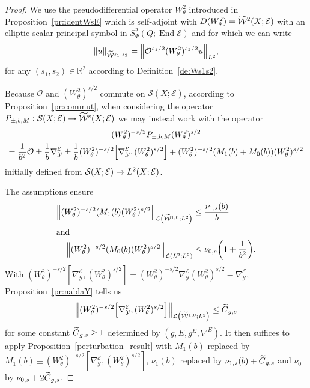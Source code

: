 \documentclass[AHL,Unicode,longabstracts]{cedram}
\newcommand{\R}{\mathbb{R}}
\newcommand{\clW}{\mathcal{W}}
\newcommand{\clY}{\mathcal{Y}}
\newcommand{\clO}{\mathcal{O}}
\newcommand{\clE}{\mathcal{E}}
\newcommand{\clS}{\mathcal{S}}
\newcommand{\clL}{\mathcal{L}}
\DeclareMathOperator{\End}{End}
\let\oldtilde\tilde
\renewcommand*{\tilde}[1]{\mathchoice{\widetilde{#1}}{\widetilde{#1}}{\oldtilde{#1}}{\oldtilde{#1}}}
\let\originalleft\left
\let\originalright\right
\renewcommand{\left}{\mathopen{}\mathclose\bgroup\originalleft}
\renewcommand{\right}{\aftergroup\egroup\originalright}
\renewcommand*{\to}{\mathchoice{\longrightarrow}{\rightarrow}{\rightarrow}{\rightarrow}}
\begin{document}
\begin{proof}
We use the pseudodifferential operator $W^{2}_{\theta}$ introduced in Proposition~\ref{pr:identWsE} which is self-adjoint with $D(W^{2}_{\theta})=\tilde{\clW}^{2}(X;\clE)$ with an elliptic scalar principal symbol in $S^{2}_{\Psi}(Q;\End\clE)$ and for which we can write
\[
\|u\|_{\widetilde{\clW}^{s_{1},s_{2}}}=\left\|\clO^{s_{1}/2}(W^{2}_{\theta})^{s_{2}/2}u\right\|_{L^{2}},
\]
for any $(s_{1},s_{2})\in \R^{2}$ according to Definition~\ref{de:Ws1s2}.

Because $\clO$ and $(W^{2}_{\theta})^{s/2}$ commute on $\clS(X;\clE)$, according to Proposition~\ref{pr:commut}, when considering the operator $P_{\pm,b,M}:\clS(X;\clE)\to \tilde{\clW}^{s}(X;\clE)$ we may instead work with the operator
\begin{multline*}
(W^2_{\theta})^{-s/2}P_{\pm,b,M}(W^2_{\theta})^{s/2}
\\
=\frac{1}{b^{2}}\clO\pm \frac{1}{b}\nabla_{\clY}^{\clE}\pm\frac{1}{b}(W^2_{\theta})^{-s/2}\left[\nabla_{\clY}^{\clE},(W^2_{\theta})^{s/2}\right]
+ (W^2_{\theta})^{-s/2}(M_{1}(b)+M_{0}(b))(W^2_{\theta})^{s/2}
\end{multline*}
initially defined from $\clS(X;\clE)\to L^{2}(X;\clE)$.

The assumptions ensure
\begin{align*}
\left\|(W^2_{\theta})^{-s/2}(M_{1}(b)(W^2_{\theta})^{s/2}\right\|_{\clL\left(\widetilde{\clW}^{1,0};L^{2}\right)}&\leq \frac{\nu_{1,s}(b)}{b}\\
\intertext{and}
\left\|(W^2_{\theta})^{-s/2}(M_{0}(b)(W^2_{\theta})^{s/2}\right\|_{\clL(L^{2};L^{2})} &\leq
\nu_{0,s}\left(1+\frac{1}{b^{2}}\right).
\end{align*}
With $(W^2_{\theta})^{-s/2}[\nabla_{\clY}^{\clE},(W^2_{\theta})^{s/2}]=(W^2_{\theta})^{-s/2}\nabla_{\clY}^{\clE}(W^2_{\theta})^{s/2}-\nabla_{\clY}^{\clE}$, Proposition~\ref{pr:nablaY} tells us
\begin{equation}\label{eq:commutnabY}
\left\|(W^2_{\theta})^{-s/2}\left[\nabla_{\clY}^{\clE},(W^2_{\theta})^{s/2}\right]\right\|_{\clL\left(\widetilde{\clW}^{1,0};L^{2}\right)}\leq \tilde{C}_{g,s}
\end{equation}
for some constant $\tilde{C}_{g,s}\geq 1$ determined by $(g,E,g^{E},\nabla^{E})$. It then suffices to apply Proposition~\ref{perturbation_result} with $M_{1}(b)$ replaced by $M_{1}(b)\pm(W^2_{\theta})^{-s/2}[\nabla_{\clY}^{\clE},(W^2_{\theta})^{s/2}]$, $\nu_{1}(b)$ replaced by $\nu_{1,s}(b)+\tilde{C}_{g,s}$ and $\nu_{0}$ by $\nu_{0,s}+2\tilde{C}_{g,s}$.
\end{proof}
\end{document}
